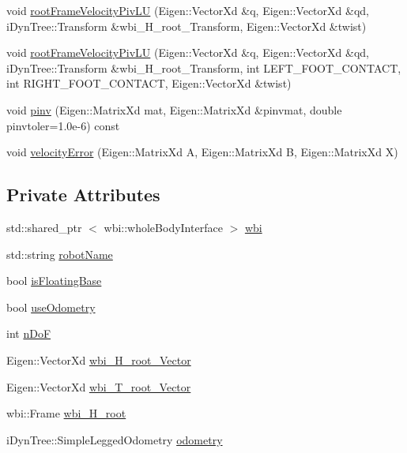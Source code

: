 \begin{DoxyCompactItemize}
\item 
void \hyperlink{classIcubControllerServer_a27211ecba9fc8618733bcaea9ff7d140}{root\-Frame\-Velocity\-Piv\-L\-U} (\-Eigen\-::\-Vector\-Xd \&q, \-Eigen\-::\-Vector\-Xd \&qd, i\-Dyn\-Tree\-::\-Transform \&wbi\-\_\-\-H\-\_\-root\-\_\-\-Transform, \-Eigen\-::\-Vector\-Xd \&twist)
\item 
void \hyperlink{classIcubControllerServer_a82650f373c3c2c52a91cc744c67b0dcf}{root\-Frame\-Velocity\-Piv\-L\-U} (\-Eigen\-::\-Vector\-Xd \&q, \-Eigen\-::\-Vector\-Xd \&qd, i\-Dyn\-Tree\-::\-Transform \&wbi\-\_\-\-H\-\_\-root\-\_\-\-Transform, int \-L\-E\-F\-T\-\_\-\-F\-O\-O\-T\-\_\-\-C\-O\-N\-T\-A\-C\-T, int \-R\-I\-G\-H\-T\-\_\-\-F\-O\-O\-T\-\_\-\-C\-O\-N\-T\-A\-C\-T, \-Eigen\-::\-Vector\-Xd \&twist)
\item 
void \hyperlink{classIcubControllerServer_a0132b1ddc3dafd29506e4684ea42cf58}{pinv} (\-Eigen\-::\-Matrix\-Xd mat, \-Eigen\-::\-Matrix\-Xd \&pinvmat, double pinvtoler=1.\-0e-\/6) const 
\item 
void \hyperlink{classIcubControllerServer_aaedff28c5d9ac9a7cdbc24c9e0cbc5b3}{velocity\-Error} (\-Eigen\-::\-Matrix\-Xd \-A, \-Eigen\-::\-Matrix\-Xd \-B, \-Eigen\-::\-Matrix\-Xd \-X)
\end{DoxyCompactItemize}
\subsection*{\-Private \-Attributes}
\begin{DoxyCompactItemize}
\item 
std\-::shared\-\_\-ptr\*
$<$ wbi\-::whole\-Body\-Interface $>$ \hyperlink{classIcubControllerServer_ae8a89707675adb58bb3006bc085828b7}{wbi}
\item 
std\-::string \hyperlink{classIcubControllerServer_a041d6687258c36677914b1d15f18e153}{robot\-Name}
\item 
bool \hyperlink{classIcubControllerServer_aebc2019921c3eabb53c01012fbd2355a}{is\-Floating\-Base}
\item 
bool \hyperlink{classIcubControllerServer_adc410f503b14ed288c01e877ac405114}{use\-Odometry}
\item 
int \hyperlink{classIcubControllerServer_ab5fb1f18775cfe3036894c73dc21ebcf}{n\-Do\-F}
\item 
\-Eigen\-::\-Vector\-Xd \hyperlink{classIcubControllerServer_a42f6a8db660da9dbafbc57941b1ee12f}{wbi\-\_\-\-H\-\_\-root\-\_\-\-Vector}
\item 
\-Eigen\-::\-Vector\-Xd \hyperlink{classIcubControllerServer_a818b66e75b7f9457a6a5bcbb3c1306a7}{wbi\-\_\-\-T\-\_\-root\-\_\-\-Vector}
\item 
wbi\-::\-Frame \hyperlink{classIcubControllerServer_afd983b69c043eedf958e53582b22195a}{wbi\-\_\-\-H\-\_\-root}
\item 
i\-Dyn\-Tree\-::\-Simple\-Legged\-Odometry \hyperlink{classIcubControllerServer_ad0484106ab9d7fd42e2bd682338871c7}{odometry}
\end{DoxyCompactItemize}
